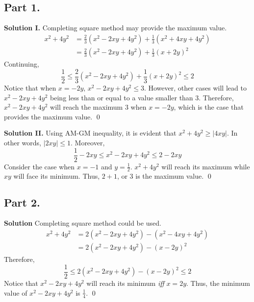 \documentclass{article}
\newenvironment{solution}{\begin{trivlist}\item[]{\bf Solution}}{\qed \end{trivlist}}
\begin{document}
\subsection*{Part 1.}
\textbf{Solution I.} Completing square method may provide
the maximum value.
\begin{align*}
    x^2 + 4y^2
    &= \frac{2}{3} \left( x^2 - 2xy + 4y^2 \right)
        + \frac{1}{3} \left( x^2 + 4xy + 4y^2 \right) \\
    &= \frac{2}{3} \left( x^2 - 2xy + 4y^2 \right)
        + \frac{1}{3} (x + 2y)^2
\end{align*}
Continuing,
\[
\frac{1}{2} \leq \frac{2}{3} \left( x^2 - 2xy + 4y^2 \right)
    + \frac{1}{3} (x + 2y)^2 \leq 2
\]
Notice that when $x = -2y$, $x^2 - 2xy + 4y^2 \leq 3$.
However, other cases will lead to $x^2 - 2xy + 4y^2$ being
less than or equal to a value smaller than $3$. Therefore,
$x^2 - 2xy + 4y^2$ will reach the maximum $3$ when $x = -2y$,
which is the case that provides the maximum value.
\qed

\textbf{Solution II.} Using AM-GM inequality, it is evident
that $x^2 + 4y^2 \geq |4xy|$. In other words, $|2xy| \leq 1$.
Moreover,
\[
\frac{1}{2} - 2xy \leq x^2 - 2xy + 4y^2 \leq 2 - 2xy
\]
Consider the case when $x = -1$ and $y = \frac{1}{2}$.
$x^2 + 4y^2$ will reach its maximum while $xy$ will face
its minimum. Thus, $2 + 1$, or $\boxed{3}$ is the maximum value.
\qed

\subsection*{Part 2.}
\begin{solution}
Completing square method could be used.
\begin{align*}
    x^2 + 4y^2
    &= 2 \left( x^2 - 2xy + 4y^2 \right) - (x^2 - 4xy + 4y^2) \\
    &= 2 \left( x^2 - 2xy + 4y^2 \right) - (x - 2y)^2
\end{align*}
Therefore,
\[
\frac{1}{2}
\leq 2 \left( x^2 - 2xy + 4y^2 \right)
    - (x - 2y)^2
\leq 2
\]
Notice that $x^2 - 2xy + 4y^2$ will reach its minimum
\textit{iff} $x = 2y$. Thus, the minimum value of
$x^2 - 2xy + 4y^2$ is $\boxed{\frac{1}{4}}$.
\end{solution}
\end{document}
